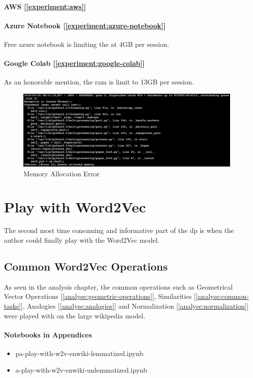 \paragraph{AWS [\ref{experiment:aws}]}

\paragraph{Azure Notebook [\ref{experiment:azure-notebook}]}
Free azure notebook is limiting the at 4GB per session.

\paragraph{Google Colab [\ref{experiment:google-colab}]}
As an honorable mention, the ram is limit to 13GB per session.

\begin{figure}[ht!]
\centering
\includegraphics[width=\linewidth]{99-imgs/gensim_memory_allocation_error}
\caption{Memory Allocation Error}
\label{fig:error-memory-allocation}
\end{figure}


\section{Play with Word2Vec}
The second most time consuming and informative part of the \gls{dp} is when the author could finally play with the Word2Vec model.

\subsection{Common Word2Vec Operations}
As seen in the analysis chapter, the common operations such as Geometrical Vector Operations [\ref{analyse:geometric-operations}], Similarities [\ref{analyse:common-tasks}], Analogies [\ref{analyse:analogies}] and Normalization [\ref{analyse:normalization}] were played with on the large wikipedia model.

\paragraph{Notebooks in Appendices}
\begin{itemize}
    \setlength\itemsep{0em}
    \item pa-play-with-w2v-enwiki-lemmatized.ipynb
    \item a-play-with-w2v-enwiki-unlemmatized.ipynb
\end{itemize}

